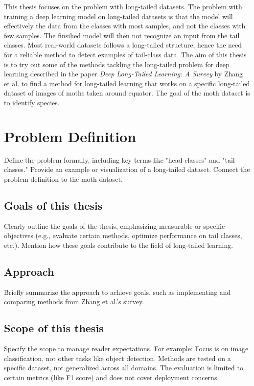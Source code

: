 

\label{sec:introduction}
This thesis focuses on the problem with long-tailed datasets. The problem with training a deep learning model on long-tailed datasets is that the model will effectively 
the data from the classes with most samples, and not the classes with few samples. The finsihed model will then not recognize an input from the tail classes. Most real-world
datasets follows a long-tailed structure, hence the need for a reliable method to detect examples of tail-class data. The aim of this thesis is to try out some of the methods tackling the long-tailed problem for deep learning described in the paper \textit{Deep Long-Tailed Learning: A Survey} by Zhang et al.\cite{zhang2023deep} to find a method for long-tailed learning that works on a specific long-tailed dataset of images of moths taken around equator. The goal of the moth dataset is to identify species.

\section{Problem Definition}
Define the problem formally, including key terms like "head classes" and "tail classes."
Provide an example or visualization of a long-tailed dataset.
Connect the problem definition to the moth dataset.

\subsection{Goals of this thesis}
Clearly outline the goals of the thesis, emphasizing measurable or specific objectives (e.g., evaluate certain methods, optimize performance on tail classes, etc.).
Mention how these goals contribute to the field of long-tailed learning.

\subsection{Approach}
Briefly summarize the approach to achieve goals, such as implementing and comparing methods from Zhang et al.’s survey.

\subsection{Scope of this thesis}
Specify the scope to manage reader expectations. For example:
Focus is on image classification, not other tasks like object detection.
Methods are tested on a specific dataset, not generalized across all domains.
The evaluation is limited to certain metrics (like F1 score) and does not cover deployment concerns.

